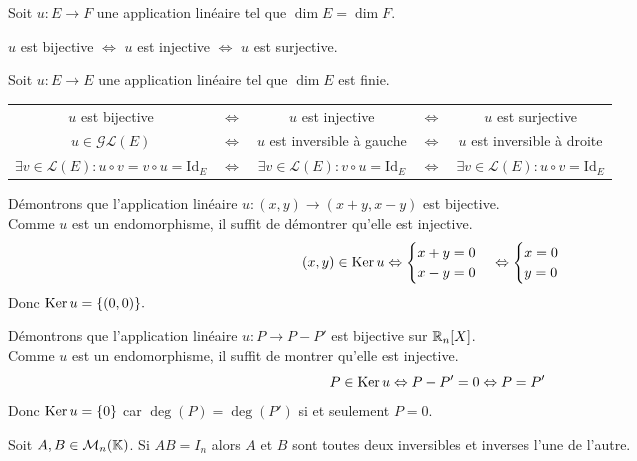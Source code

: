 \documentclass{book}
\begin{document}
\begin{Proposition}[Cas $\dim E = \dim F$]
Soit $u:E\to F$ une application linéaire tel que $\dim E = \dim F$.
\begin{center}
$u$ est bijective $\Leftrightarrow$ $u$ est injective $\Leftrightarrow$ $u$ est surjective.
\end{center}
Soit $u:E\to E$ une application linéaire tel que $\dim E$ est finie.
\begin{center}
\begin{tabular}{ccccc}
$u$ est bijective& $\Leftrightarrow$& $u$ est injective &$\Leftrightarrow$ &$u$ est surjective \\
$u\in \mathcal{GL}(E)$ &$\Leftrightarrow$ &  $u$ est inversible à gauche &$\Leftrightarrow$ &  $u$ est inversible à droite \\
$\exists v\in \mathcal{L}(E): u\circ v =v \circ u = \mathrm{Id}_E$ &$\Leftrightarrow$ &  $\exists v\in \mathcal{L}(E): v\circ u= \mathrm{Id}_E$  &$\Leftrightarrow$ &  $\exists v\in \mathcal{L}(E): u\circ v= \mathrm{Id}_E$
\end{tabular}
\end{center}
\end{Proposition}
\begin{Exemple}
Démontrons que l'application linéaire $u:(x,y)\to (x+y,x-y)$ est bijective.\\
Comme $u$ est un endomorphisme, il suffit de démontrer qu'elle est injective.\\
$$(x,y)\in \operatorname{Ker} u \Leftrightarrow \begin{cases}x+y=0\\x-y=0\end{cases}  \Leftrightarrow  \begin{cases}x=0\\y=0\end{cases} $$ 
Donc $\operatorname{Ker} u =\{(0,0)\}.$
\end{Exemple}
\begin{Exemple}
Démontrons que l'application linéaire $u:P\to P-P'$ est bijective sur $\mathbb{R}_n[X]$.\\
Comme $u$ est un endomorphisme, il suffit de montrer qu'elle est injective.\\
$$P\in \operatorname{Ker} u \Leftrightarrow P-P'=0  \Leftrightarrow  P=P'$$ 
Donc $\operatorname{Ker} u =\{0\}$ car $\deg(P)=\deg(P')$ si et seulement $P=0$.
\end{Exemple}
\begin{Proposition}
Soit $A,B\in \mathcal{M}_{n}(\mathbb{K})$.
Si $AB=I_n$ alors $A$ et $B$ sont toutes deux inversibles et inverses l'une de l'autre.
\end{Proposition}
\end{document}
